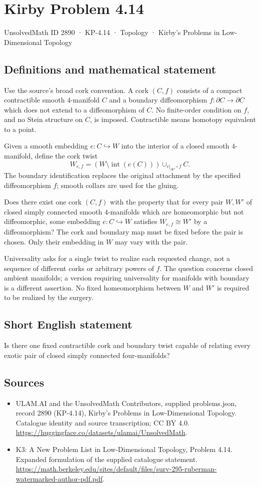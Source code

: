 \documentclass[11pt,a4paper]{article}
\begin{document}
\section*{Kirby Problem 4.14}\label{2890}
{\small UnsolvedMath ID 2890 · KP-4.14 · Topology · Kirby's Problems in Low-Dimensional Topology}
\subsection{Definitions and mathematical statement}
Use the source's broad cork convention. A cork $(C,f)$ consists of a
compact contractible smooth $4$-manifold $C$ and a boundary
diffeomorphism $f:\partial C\to\partial C$ which does not extend to
a diffeomorphism of $C$. No finite-order condition on $f$, and no
Stein structure on $C$, is imposed. Contractible means homotopy
equivalent to a point.

Given a smooth embedding $e:C\hookrightarrow W$ into the interior
of a closed smooth $4$-manifold, define the cork twist
\[
 W_{e,f}=(W\setminus\operatorname{int}(e(C)))\cup_{e|_{\partial C}\circ f}C.
\]
The boundary identification replaces the original attachment by the
specified diffeomorphism $f$; smooth collars are used for the gluing.

Does there exist one cork $(C,f)$ with the property that for every
pair $W,W'$ of closed simply connected smooth $4$-manifolds which
are homeomorphic but not diffeomorphic, some embedding $e:C\hookrightarrow W$
satisfies $W_{e,f}\cong W'$ by a diffeomorphism?
The cork and boundary map must be fixed before the pair is chosen.
Only their embedding in $W$ may vary with the pair.

Universality asks for a single twist to realize each requested change,
not a sequence of different corks or arbitrary powers of $f$.
The question concerns closed ambient manifolds; a version requiring
universality for manifolds with boundary is a different assertion.
No fixed homeomorphism between $W$ and $W'$ is required to be
realized by the surgery.
\subsection{Short English statement}
Is there one fixed contractible cork and boundary twist capable of relating every exotic pair of closed simply connected four-manifolds?
\subsection{Sources}
\begin{itemize}
\item[S1] ULAM.AI and the UnsolvedMath Contributors, supplied problems.json, record 2890 (KP-4.14), Kirby's Problems in Low-Dimensional Topology. Catalogue identity and source transcription; CC BY 4.0.
\url{https://huggingface.co/datasets/ulamai/UnsolvedMath}.
\item[S2] K3: A New Problem List in Low-Dimensional Topology, Problem 4.14. Expanded formulation of the supplied catalogue statement.
\url{https://math.berkeley.edu/sites/default/files/surv-295-ruberman-watermarked-author-pdf.pdf}.
\end{itemize}
\end{document}
